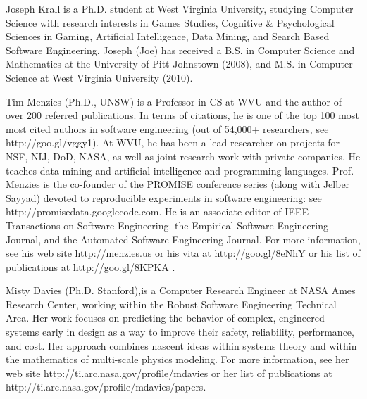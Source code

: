 \documentclass[10pt,journal,compsoc]{IEEEtran}
\begin{document}



    


 

\begin{IEEEbiography}{Joseph Krall}
is a Ph.D. student at West Virginia University, studying Computer Science with research interests in Games Studies, Cognitive \& Psychological Sciences in Gaming, Artificial Intelligence, Data Mining, and Search Based Software Engineering.  Joseph (Joe) has received a B.S. in Computer Science and Mathematics at the University of Pitt-Johnstown (2008), and  M.S. in Computer Science at West Virginia University (2010).
\end{IEEEbiography}

\begin{IEEEbiography}{Tim Menzies} (Ph.D., UNSW)
is a Professor in CS at WVU and  the author of
over 200 referred publications. In terms of citations, he is one of the top 100 most
most cited
authors in  software engineering (out of 54,000+ researchers, see
http://goo.gl/vggy1). At WVU, he has been a lead researcher on
projects for NSF, NIJ, DoD, NASA, as well as joint research work with
private companies. He teaches data mining and artificial intelligence
and programming languages. Prof. Menzies is the co-founder of the
PROMISE conference series (along with Jelber Sayyad) devoted to reproducible experiments in
software engineering: see http://promisedata.googlecode.com. He is an
associate editor of IEEE Transactions on Software Engineering. the Empirical Software Engineering Journal, and the
Automated Software Engineering Journal.  For more information, see his web site http://menzies.us
or his vita at http://goo.gl/8eNhY or his list of publications at
http://goo.gl/8KPKA .
\end{IEEEbiography}


\begin{IEEEbiography}{Misty Davies}
(Ph.D. Stanford),is a Computer Research Engineer at
  NASA Ames Research Center, working within the
  Robust Software Engineering Technical Area.  Her
  work focuses on predicting the behavior of
  complex, engineered systems early in design as a
  way to improve their safety, reliability,
  performance, and cost. Her approach combines
  nascent ideas within systems theory and within the
  mathematics of multi-scale physics modeling.
For more information, see her web site http://ti.arc.nasa.gov/profile/mdavies
or her  list of publications at
http://ti.arc.nasa.gov/profile/mdavies/papers.
\end{IEEEbiography}
\end{document}
